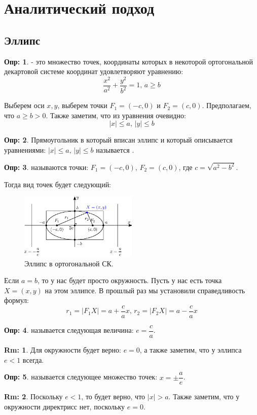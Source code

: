 \documentclass[12pt]{article}
\theoremstyle{definition}
\newtheorem{defn}{Опр:}
\newtheorem{rem}{Rm:}
\begin{document}

\section*{Аналитический подход}
\subsection*{Эллипс}

\begin{defn}
	 - это множество точек, координаты которых в некоторой ортогональной декартовой системе координат удовлетворяют уравнению:
	$$
		\dfrac{x^2}{a^2} + \dfrac{y^2}{b^2} = 1, \, a \geq b
	$$
\end{defn}
Выберем оси $x,y$, выберем точки $F_1 = (-c,0)$ и $F_2=(c,0)$. Предполагаем, что $a \geq b > 0$. Также заметим, что из уравнения очевидно: 
$$
	|x| \leq a, \, |y| \leq b
$$
\begin{defn}
	Прямоугольник в который вписан эллипс и который описывается уравнениями: $|x| \leq a, \, |y| \leq b$ называется .
\end{defn}
\begin{defn}
	 называются точки: $F_1 = (-c,0), \, F_2 = (c,0)$, где $c = \sqrt{a^2 - b^2}$.
\end{defn}
Тогда вид точек будет следующий:
\begin{figure}[H]
	\centering
	\includegraphics[width=0.5\textwidth]{ANGL3_1.eps}
	\caption{Эллипс в ортогональной СК.}
	\label{3_1}
\end{figure}
Если $a = b$, то у нас будет просто окружность. Пусть у нас есть точка $X = (x,y)$ на этом эллипсе. В прошлый раз мы установили справедливость формул:
$$
	r_1 = |F_1X| = a + \dfrac{c}{a}x, \, r_2 = |F_2X| = a - \dfrac{c}{a}x
$$
\begin{defn}
	 называется следующая величина: $e = \dfrac{c}{a}$.
\end{defn}
\begin{rem}
	Для окружности будет верно: $e = 0$, а также заметим, что у эллипса $e <1$ всегда.
\end{rem}
\begin{defn}
	 называется следующее множество точек: $x = \pm \dfrac{a}{e}$.
\end{defn}
\begin{rem}
	Поскольку $e < 1$, то будет верно, что $|x| > a$. Также заметим, что у окружности директрисс нет, поскольку $e = 0$.
\end{rem}
\end{document}
